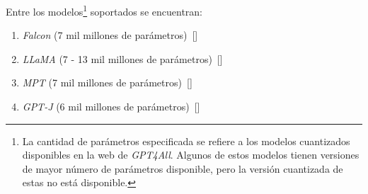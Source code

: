         Entre los modelos\footnote{La cantidad de parámetros especificada se refiere a los modelos cuantizados disponibles en la web de \emph{GPT4All}. Algunos de estos modelos tienen versiones de mayor número de parámetros disponible, pero la versión cuantizada de estas no está disponible.} soportados se encuentran:

        \begin{enumerate}
            \item \emph{Falcon} (7 mil millones de parámetros)~[\cite{falcon}]
            \item \emph{LLaMA} (7 - 13 mil millones de parámetros)~[\cite{llama}]
            \item \emph{MPT} (7 mil millones de parámetros)~[\cite{mpt}]
            \item \emph{GPT-J} (6 mil millones de parámetros)~[\cite{gptj}]
        \end{enumerate}

